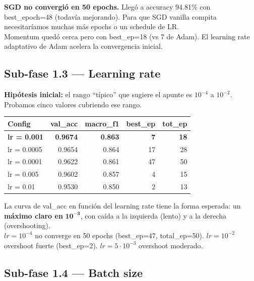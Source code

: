 \documentclass[11pt,a4paper]{article}
\newcommand{\winner}[1]{\cellcolor{accent2!15}\textbf{#1}}
\begin{document}
\begin{aprendimos}
\textbf{SGD no convergió en 50 epochs.} Llegó a accuracy 94.81\% con best\_epoch=48 (todavía mejorando). Para que SGD vanilla compita necesitaríamos muchas más epochs o un schedule de LR. \\[0.2em]
Momentum quedó cerca pero con best\_ep=18 (vs 7 de Adam). El learning rate adaptativo de Adam acelera la convergencia inicial.
\end{aprendimos}

\subsection{Sub-fase 1.3 — Learning rate}

\textbf{Hipótesis inicial:} el rango ``típico'' que sugiere el apunte es $10^{-4}$ a $10^{-2}$. Probamos cinco valores cubriendo ese rango.

\begin{center}
\small
\begin{tabular}{@{}lrrrr@{}}
\toprule
\textbf{Config} & \textbf{val\_acc} & \textbf{macro\_f1} & \textbf{best\_ep} & \textbf{tot\_ep} \\
\midrule
\winner{lr = 0.001}        & \winner{0.9674} & \winner{0.863} & \winner{7}  & \winner{18} \\
lr = 0.0005                & 0.9654 & 0.864 & 17 & 28 \\
lr = 0.0001                & 0.9622 & 0.861 & 47 & 50 \\
lr = 0.005                 & 0.9602 & 0.857 & 4  & 15 \\
lr = 0.01                  & 0.9530 & 0.850 & 2  & 13 \\
\bottomrule
\end{tabular}
\end{center}

\begin{aprendimos}
La curva de val\_acc en función del learning rate tiene la forma esperada: un \textbf{máximo claro en } $\boldsymbol{10^{-3}}$, con caída a la izquierda (lento) y a la derecha (overshooting). \\[0.2em]
$lr = 10^{-4}$ no converge en 50 epochs (best\_ep=47, total\_ep=50). $lr = 10^{-2}$ overshoot fuerte (best\_ep=2). $lr = 5\!\cdot\!10^{-3}$ overshoot moderado.
\end{aprendimos}

\subsection{Sub-fase 1.4 — Batch size}
\end{document}
